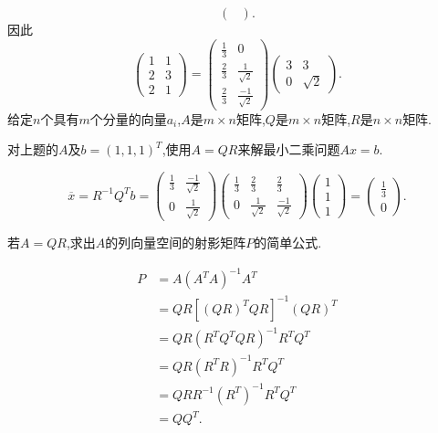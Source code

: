 ﻿\documentclass{book} \usepackage{exsheets} \usepackage{xeCJK}
\begin{document}
\begin{solution}
$$\begin{pmatrix}
\end{pmatrix}.
$$
因此
$$
\begin{pmatrix}
  1&1\\
  2&3\\
  2&1
\end{pmatrix}=
\begin{pmatrix}
  \frac{1}{3}&0\\
  \frac{2}{3}&\frac{1}{\sqrt{2}}\\
  \frac{2}{3}&\frac{-1}{\sqrt{2}}
\end{pmatrix}
\begin{pmatrix}
  3&3\\
  0&\sqrt{2}
\end{pmatrix}.
$$
给定$n$个具有$m$个分量的向量$a_i$,$A$是$m\times n$矩阵,$Q$是$m\times
n$矩阵,$R$是$n\times n$矩阵.
\end{solution}
\begin{question}
  对上题的$A$及$b=(1,1,1)^T$,使用$A=QR$来解最小二乘问题$Ax=b$.
\end{question}
\begin{solution}
  $$ 
\overline{x}=R^{-1}Q^Tb=
\begin{pmatrix}
  \frac{1}{3}&\frac{-1}{\sqrt{2}}\\
  0&\frac{1}{\sqrt{2}}
\end{pmatrix}
\begin{pmatrix}
  \frac{1}{3}&\frac{2}{3}&\frac{2}{3}\\
  0&\frac{1}{\sqrt{2}}&\frac{-1}{\sqrt{2}}
\end{pmatrix}
\begin{pmatrix}
  1\\
1\\
1
\end{pmatrix}=
\begin{pmatrix}
  \frac{1}{3}\\
0
\end{pmatrix}.
$$  
\end{solution}
\begin{question}
 若$A=QR$,求出$A$的列向量空间的射影矩阵$P$的简单公式.
\end{question}
\begin{solution}
\begin{align*}
P&=A(A^TA)^{-1}A^T
\\&=QR[(QR)^TQR]^{-1}(QR)^T
\\&=QR(R^TQ^TQR)^{-1}R^TQ^T
\\&=QR(R^TR)^{-1}R^TQ^T
\\&=QRR^{-1}(R^T)^{-1}R^TQ^T
\\&=QQ^T.
\end{align*}
\end{solution}
\end{document}
